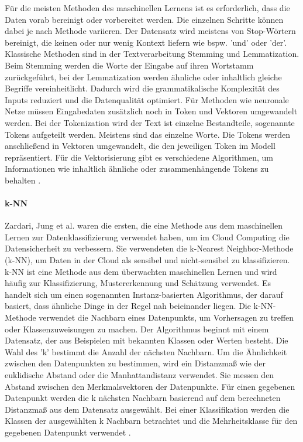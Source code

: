 Für die meisten Methoden des maschinellen Lernens ist es erforderlich, dass die Daten vorab bereinigt oder vorbereitet werden. Die einzelnen Schritte können dabei je nach Methode variieren. Der Datensatz wird meistens von Stop-Wörtern bereinigt, die keinen oder nur wenig Kontext liefern wie bspw. 'und' oder 'der'. Klassische Methoden sind in der Textverarbeitung Stemming und Lemmatization. Beim Stemming werden die Worte der Eingabe auf ihren Wortstamm zurückgeführt, bei der Lemmatization werden ähnliche oder inhaltlich gleiche Begriffe vereinheitlicht.
Dadurch wird die grammatikalische Komplexität des Inputs reduziert und die Datenqualität optimiert. Für Methoden wie neuronale Netze müssen Eingabedaten zusätzlich noch in Token und Vektoren umgewandelt werden. Bei der Tokenization wird der Text ist einzelne Bestandteile, sogenannte Tokens aufgeteilt werden. Meistens sind das einzelne Worte. Die Tokens werden anschließend in Vektoren umgewandelt, die den jeweiligen Token im Modell repräsentiert. Für die Vektorisierung gibt es verschiedene Algorithmen, um Informationen wie inhaltlich ähnliche oder zusammenhängende Tokens zu behalten \cite{Kamath.2019}.


\paragraph{k-NN}
Zardari, Jung et al. \cite{Zardari.2014} waren die ersten, die eine Methode aus dem maschinellen Lernen zur Datenklassifizierung verwendet haben, um im Cloud Computing die Datensicherheit zu verbessern. Sie verwendeten die k-Nearest Neighbor-Methode (k-NN), um Daten in der Cloud als sensibel und nicht-sensibel zu klassifizieren. k-NN ist eine Methode aus dem überwachten maschinellen Lernen und wird häufig zur Klassifizierung, Mustererkennung und Schätzung verwendet. Es handelt sich um einen sogenannten Instanz-basierten Algorithmus, der darauf basiert, dass ähnliche Dinge in der Regel nah beieinander liegen. Die k-NN-Methode verwendet die Nachbarn eines Datenpunkts, um Vorhersagen zu treffen oder Klassenzuweisungen zu machen. Der Algorithmus beginnt mit einem Datensatz, der aus Beispielen mit bekannten Klassen oder Werten besteht. Die Wahl des 'k' bestimmt die Anzahl der nächsten Nachbarn. Um die Ähnlichkeit zwischen den Datenpunkten zu bestimmen, wird ein Distanzmaß wie der euklidische Abstand oder die Manhattandistanz verwendet. Sie messen den Abstand zwischen den Merkmalsvektoren der Datenpunkte. Für einen gegebenen Datenpunkt werden die k nächsten Nachbarn basierend auf dem berechneten Distanzmaß aus dem Datensatz ausgewählt. Bei einer Klassifikation werden die Klassen der ausgewählten k Nachbarn betrachtet und die Mehrheitsklasse für den gegebenen Datenpunkt verwendet \cite{Frochte.2018b}.

